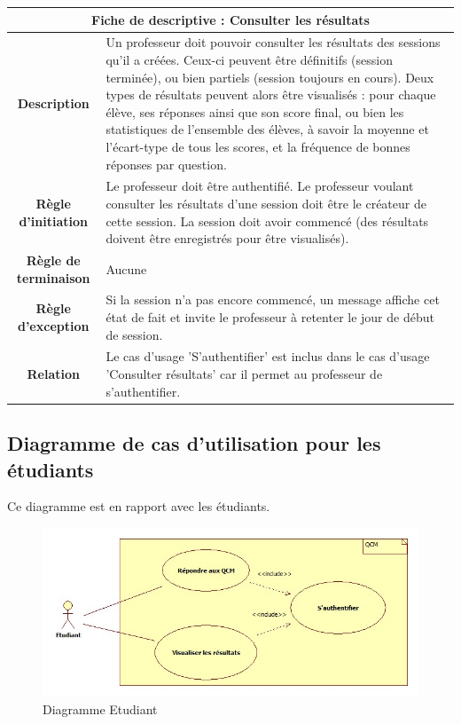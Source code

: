 \documentclass[10pt,a4paper,titlepage]{report}
\begin{document}
	
	\begin{tabular}{|c|p{8cm}|}
	\hline 
	\multicolumn{2}{|c|}{\textbf{Fiche de descriptive : Consulter les résultats}} \\ 
	\hline 
	\textbf{Description} & Un professeur doit pouvoir consulter les résultats des sessions qu'il a créées. Ceux-ci
	peuvent être définitifs (session terminée), ou bien partiels (session toujours en cours).
	Deux types de résultats peuvent alors être visualisés : pour chaque élève, ses réponses
	ainsi que son score final, ou bien les statistiques de l'ensemble des élèves, à savoir la
	moyenne et l'écart-type de tous les scores, et la fréquence de bonnes réponses par
	question. \\  
	\hline
	\textbf{Règle d'initiation} & Le professeur doit être authentifié.
	Le professeur voulant consulter les résultats d'une session doit être le créateur de cette
	session.
	La session doit avoir commencé (des résultats doivent être enregistrés pour être visualisés).
		
 \\ 
	\hline 
	\textbf{Règle de terminaison} & Aucune \\ 
	\hline 
	\textbf{Règle d'exception} & Si la session n'a pas encore commencé, un message affiche cet état de fait et invite le
	professeur à retenter le jour de début de session.
 \\ 
	\hline 
	\textbf{Relation} & 
	Le cas d'usage 'S'authentifier' est inclus dans le cas d'usage 'Consulter résultats' car il 
	permet au professeur de s'authentifier. \\ 
	\hline 
	\end{tabular} 
	\subsection{Diagramme de cas d'utilisation pour les étudiants}
	Ce diagramme est en rapport avec les étudiants.
	\begin{figure}[h!]
		\caption{Diagramme Etudiant}
		\centering
		\includegraphics[scale=0.4]{Include/Etudiant.jpg}
\end{figure}
\end{document}
